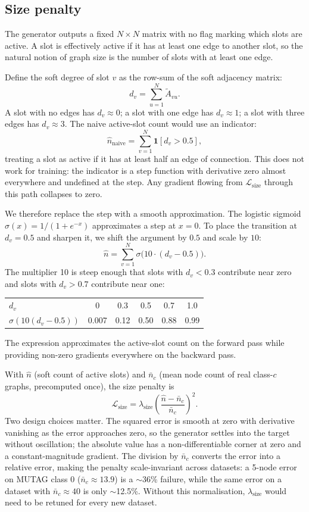 \documentclass[12pt,a4paper]{article}
\begin{document}
\subsection{Size penalty}

The generator outputs a fixed $N \times N$ matrix with no flag marking which slots are active. A slot is effectively active if it has at least one edge to another slot, so the natural notion of graph size is the number of slots with at least one edge.

Define the soft degree of slot $v$ as the row-sum of the soft adjacency matrix:
\[
  d_v = \sum_{u=1}^{N} \tilde{A}_{vu}.
\]
A slot with no edges has $d_v \approx 0$; a slot with one edge has $d_v \approx 1$; a slot with three edges has $d_v \approx 3$. The naive active-slot count would use an indicator:
\[
  \hat{n}_{\text{naive}} = \sum_{v=1}^{N} \mathbf{1}[d_v > 0.5],
\]
treating a slot as active if it has at least half an edge of connection. This does not work for training: the indicator is a step function with derivative zero almost everywhere and undefined at the step. Any gradient flowing from $\mathcal{L}_{\text{size}}$ through this path collapses to zero.

We therefore replace the step with a smooth approximation. The logistic sigmoid $\sigma(x) = 1/(1 + e^{-x})$ approximates a step at $x = 0$. To place the transition at $d_v = 0.5$ and sharpen it, we shift the argument by $0.5$ and scale by $10$:
\[
  \hat{n} = \sum_{v=1}^{N} \sigma\bigl(10 \cdot (d_v - 0.5)\bigr).
\]
The multiplier 10 is steep enough that slots with $d_v < 0.3$ contribute near zero and slots with $d_v > 0.7$ contribute near one:

\begin{center}
\begin{tabular}{lccccc}
\toprule
$d_v$ & 0 & 0.3 & 0.5 & 0.7 & 1.0 \\
$\sigma(10(d_v - 0.5))$ & 0.007 & 0.12 & 0.50 & 0.88 & 0.99 \\
\bottomrule
\end{tabular}
\end{center}

The expression approximates the active-slot count on the forward pass while providing non-zero gradients everywhere on the backward pass.

With $\hat{n}$ (soft count of active slots) and $\bar{n}_c$ (mean node count of real class-$c$ graphs, precomputed once), the size penalty is
\[
  \mathcal{L}_{\text{size}} = \lambda_{\text{size}} \left(\frac{\hat{n} - \bar{n}_c}{\bar{n}_c}\right)^2.
\]
Two design choices matter. The squared error is smooth at zero with derivative vanishing as the error approaches zero, so the generator settles into the target without oscillation; the absolute value has a non-differentiable corner at zero and a constant-magnitude gradient. The division by $\bar{n}_c$ converts the error into a relative error, making the penalty scale-invariant across datasets: a 5-node error on MUTAG class 0 ($\bar{n}_c \approx 13.9$) is a $\sim$36\% failure, while the same error on a dataset with $\bar{n}_c \approx 40$ is only $\sim$12.5\%. Without this normalisation, $\lambda_{\text{size}}$ would need to be retuned for every new dataset.
\end{document}
